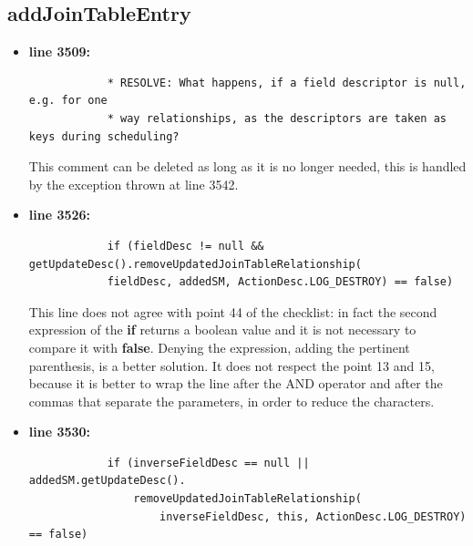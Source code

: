 \documentclass[18pt,oneside,a4paper, titlepage]{article}
\begin{document}
		\subsection{addJoinTableEntry}
		\begin{itemize}
			\item \textbf{line 3509:} \begin{lstlisting}
			* RESOLVE: What happens, if a field descriptor is null, e.g. for one
			* way relationships, as the descriptors are taken as keys during scheduling?
			\end{lstlisting}
			\vspace{0.1cm}
			
			This comment can be deleted as long as it is no longer needed, this is handled by the exception thrown at line 3542.
			\item \textbf{line 3526:} \begin{lstlisting}
			if (fieldDesc != null && getUpdateDesc().removeUpdatedJoinTableRelationship(
			fieldDesc, addedSM, ActionDesc.LOG_DESTROY) == false)
			\end{lstlisting}
			\vspace{0.1cm}
			This line does not agree with point 44 of the checklist: in fact the second expression of the \textbf{if} returns a boolean value and it is not necessary to compare it with \textbf{false}. Denying the expression, adding the pertinent parenthesis, is a better solution. It does not respect the point 13 and 15, because it is better to wrap the line after the AND operator and after the commas that separate the parameters, in order to reduce the characters.
			\item \textbf{line 3530:} \begin{lstlisting}
			if (inverseFieldDesc == null || addedSM.getUpdateDesc().
				removeUpdatedJoinTableRelationship(
					inverseFieldDesc, this, ActionDesc.LOG_DESTROY) == false)
			\end{lstlisting}
			\vspace{0.1cm}
			

\end{itemize}
\end{document}
